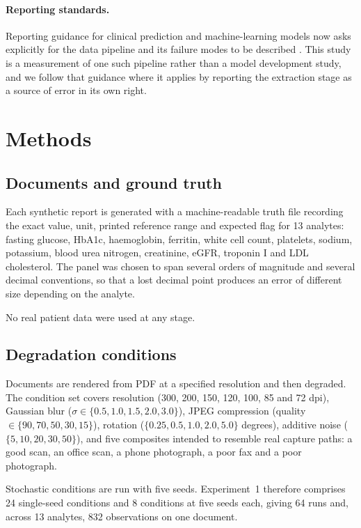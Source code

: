 \documentclass[11pt]{article}
\begin{document}
\paragraph{Reporting standards.}
Reporting guidance for clinical prediction and machine-learning models now asks explicitly for
the data pipeline and its failure modes to be described \citep{collins2024tripodai}. This study
is a measurement of one such pipeline rather than a model development study, and we follow that
guidance where it applies by reporting the extraction stage as a source of error in its own
right.

\section{Methods}

\subsection{Documents and ground truth}

Each synthetic report is generated with a machine-readable truth file recording the exact value,
unit, printed reference range and expected flag for 13 analytes: fasting glucose, HbA1c,
haemoglobin, ferritin, white cell count, platelets, sodium, potassium, blood urea nitrogen,
creatinine, eGFR, troponin I and LDL cholesterol. The panel was chosen to span several orders of
magnitude and several decimal conventions, so that a lost decimal point produces an error of
different size depending on the analyte.

No real patient data were used at any stage.

\subsection{Degradation conditions}

Documents are rendered from PDF at a specified resolution and then degraded. The condition set
covers resolution (300, 200, 150, 120, 100, 85 and 72 dpi), Gaussian blur
($\sigma \in \{0.5, 1.0, 1.5, 2.0, 3.0\}$), JPEG compression (quality
$\in \{90, 70, 50, 30, 15\}$), rotation ($\{0.25, 0.5, 1.0, 2.0, 5.0\}$ degrees), additive
noise ($\{5, 10, 20, 30, 50\}$), and five composites intended to resemble real capture paths:
a good scan, an office scan, a phone photograph, a poor fax and a poor photograph.

Stochastic conditions are run with five seeds. Experiment~1 therefore comprises 24
single-seed conditions and 8 conditions at five seeds each, giving 64 runs and, across 13
analytes, 832 observations on one document.
\end{document}
